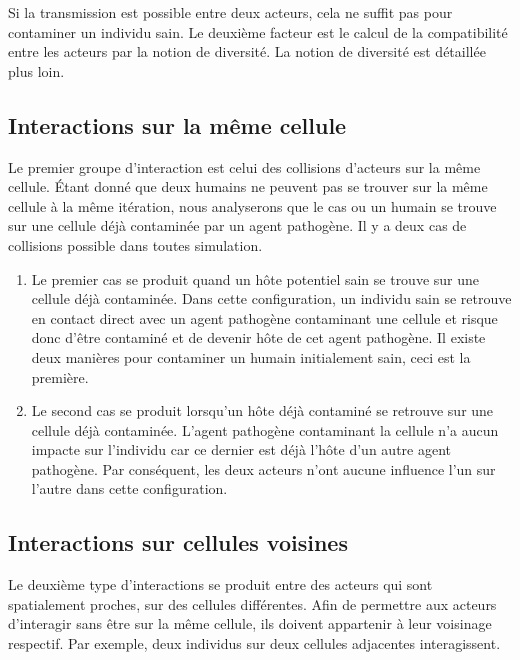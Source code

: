 Si la transmission est possible entre deux acteurs, cela ne suffit pas pour contaminer un individu sain. Le deuxième facteur est le calcul de la compatibilité entre les acteurs par la notion de diversité. La notion de diversité est détaillée plus loin.

\subsection{Interactions sur la même cellule}

Le premier groupe d'interaction est celui des collisions d'acteurs sur la même cellule. Étant donné que deux humains ne peuvent pas se trouver sur la même cellule à la même itération, nous analyserons que le cas ou un humain se trouve sur une cellule déjà contaminée par un agent pathogène. Il y a deux cas de collisions possible dans toutes simulation.

\begin{enumerate}
    \item Le premier cas se produit quand un hôte potentiel sain se trouve sur une cellule déjà contaminée. Dans cette configuration, un individu sain se retrouve en contact direct avec un agent pathogène contaminant une cellule et risque donc d'être contaminé et de devenir hôte de cet agent pathogène. Il existe deux manières pour contaminer un humain initialement sain, ceci est la première.
    \item Le second cas se produit lorsqu'un hôte déjà contaminé se retrouve sur une cellule déjà contaminée. L'agent pathogène contaminant la cellule n'a aucun impacte sur l'individu car ce dernier est déjà l'hôte d'un autre agent pathogène. Par conséquent, les deux acteurs n'ont aucune influence l'un sur l'autre dans cette configuration.
\end{enumerate}

\subsection{Interactions sur cellules voisines}

Le deuxième type d'interactions se produit entre des acteurs qui sont spatialement proches, sur des cellules différentes. Afin de permettre aux acteurs d'interagir sans être sur la même cellule, ils doivent appartenir à leur voisinage respectif. Par exemple, deux individus sur deux cellules adjacentes interagissent. 

